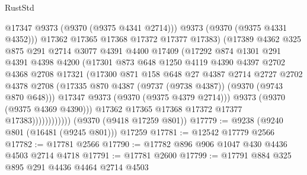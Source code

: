 \begin{lexlean}{RustStd}
\begin{coremodule}
                              @17347
                              @9373
                              (@9370 (@9375 @4341 @2714)))
                            @9373
                            (@9370 (@9375 @4331 @4352)))
                          @17362
                          @17365
                          @17368
                          @17372
                          @17377
                          @17383)
                        (@17389
                          @4362
                          @325
                          @875
                          @291
                          @2714
                          @3077
                          @4391
                          @4400
                          @17409
                          (@17292
                            @874
                            @1301
                            @291
                            @4391
                            @4398
                            @4200
                            (@17301
                              @873
                              @648
                              @1250
                              @4119
                              @4390
                              @4397
                              @2702
                              @4368
                              @2708
                              @17321
                              (@17300
                                @871
                                @158
                                @648
                                @27
                                @4387
                                @2714
                                @2727
                                @2702
                                @4378
                                @2708
                                (@17335 @870 @4387 (@9737 (@9738 @4387)) (@9370 (@9743 @870 @648)))
                                @17347
                                @9373
                                (@9370 (@9375 @4379 @2714)))
                              @9373
                              (@9370 (@9375 @4369 @4390)))
                            @17362
                            @17365
                            @17368
                            @17372
                            @17377
                            @17383))))))))))))
    (@9370 (@9418 @17259 @801))
@17779 := @9238 (@9240 @801 (@16481 (@9245 @801))) @17259
@17781 := @12542 @17779 @2566
@17782 := @17781 @2566
@17790 := @17782 @896 @906 @1047 @430 @4436 @4503 @2714 @4718
@17791 := @17781 @2600
@17799 := @17791 @884 @325 @895 @291 @4436 @4464 @2714 @4503

\end{coremodule}
\end{lexlean}
